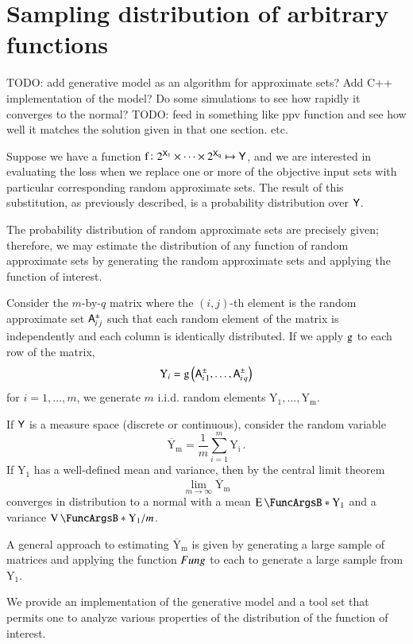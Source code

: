 \documentclass[10pt,final,hidelinks]{article}
\numberwithin{equation}{section}
\newcommand{\PS}[1]{2^{#1}}
\newcommand{\RV}[1]{\mathrm{#1}}
\theoremstyle{plain}
\begin{document}
{\section{Sampling distribution of arbitrary functions}
\label{app:samp}
TODO: add generative model as an algorithm for approximate sets? Add C++ implementation of the model? Do some simulations to see how rapidly it converges to the normal?
TODO: feed in something like ppv function and see how well it matches the solution given in that one section. etc.

Suppose we have a function $\Fun{f} \colon \PS{\Set{X}[1]} \times \cdots \times \PS{\Set{X}[q]} \mapsto \Set{Y}$, and we are interested in evaluating the loss when we replace one or more of the objective input sets with particular corresponding random approximate sets.
The result of this substitution, as previously described, is a probability distribution over $\Set{Y}$.

The probability distribution of random approximate sets are precisely given; therefore, we may estimate the distribution of any function of random approximate sets by generating the random approximate sets and applying the function of interest.

Consider the $m$-by-$q$ matrix where the $(i,j)$-th element is the random approximate set $\ASet{A}_{i\,j}$ such that each random element of the matrix is independently and each column is identically distributed.
If we apply $\Fun{g}$ to each row of the matrix,
\begin{equation}
\RV{Y}_i = \Fun{g}\left(\ASet{A}_{i\,1},\ldots,\ASet{A}_{i\,q}\right)
\end{equation}
for $i=1,\ldots,m$, we generate $m$ i.i.d. random elements $\RV{Y_1},\ldots,\RV{Y_m}$.

If $\Set{Y}$ is a measure space (discrete or continuous), consider the random variable
\begin{equation}
\RV{\overline{Y}_m} = \frac{1}{m} \sum_{i=1}^{m} \RV{Y_i}\,.
\end{equation}
If $\RV{Y_1}$ has a well-defined mean and variance, then by the central limit theorem
\begin{equation}
\lim_{m \to \infty} \RV{\overline{Y}_m}
\end{equation}
converges in distribution to a normal with a mean $\Expect{\RV{Y_1}}$ and a variance $\Var{\RV{Y_1}} / m$.

A general approach to estimating $\RV{\overline{Y}_m}$ is given by generating a large sample of matrices and applying the function $\\Fun{g}$ to each to generate a large sample from $\RV{Y_1}$.

We provide an implementation of the generative model and a tool set that permits one to analyze various properties of the distribution of the function of interest.
}


\end{document}

